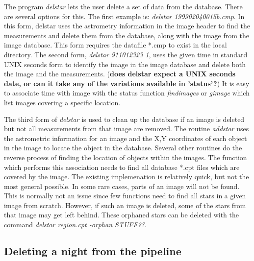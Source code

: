 \documentclass{article}
\newcommand{\note}[1]{({\bf #1})}
\newcommand\pr{\em}                   %
\begin{document}
The program {\pr delstar} lets the user delete a set of data from the
database.  There are several options for this.  The first example is:
{\pr delstar 199902040015b.cmp}.  In this form, delstar uses the
astrometry information in the image header to find the measurements
and delete them from the database, along with the image from the image
database.  This form requires the datafile *.cmp to exist in the local
directory.  The second form, {\pr delstar 911012323 1}, uses the given
time in standard UNIX seconds form to identify the image in the image
database and delete both the image and the measurements.  \note{does
delstar expect a UNIX seconds date, or can it take any of the
variations available in 'status'?}  It is easy to associate time with
image with the status function {\pr findimages} or {\pr gimage} which
list images covering a specific location.

The third form of {\pr delstar} is used to clean up the database if an
image is deleted but not all measurements from that image are removed.
The routine {\pr addstar} uses the astrometric information for an
image and the X,Y coordinates of each object in the image to locate
the object in the database.  Several other routines do the reverse
process of finding the location of objects within the images.  The
function which performs this association needs to find all database
*.cpt files which are covered by the image.  The existing
implemenation is relatively quick, but not the most general possible.
In some rare cases, parts of an image will not be found.  This is
normally not an issue since few functions need to find all stars in a
given image from scratch.  However, if such an image is deleted, some
of the stars from that image may get left behind.  These orphaned
stars can be deleted with the command {\pr delstar region.cpt -orphan
STUFF??}.

\subsection{Deleting a night from the pipeline}
\end{document}

